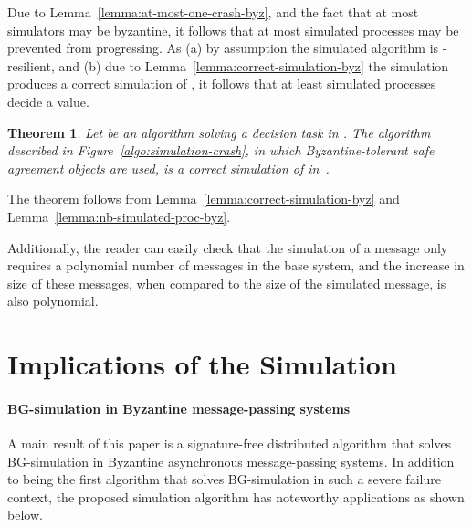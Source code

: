 \documentclass[11pt,letterpaper]{article}
\newtheorem{theorem}{Theorem}
\newlength {\afterproof}
\newcommand{\toto}{xxx}
\newenvironment{proofT}{\noindent{\bf Proof }}
{\hspace*{\fill}\par\vspace{\afterproof}}
\newenvironment{proofL}{\noindent{\bf Proof }}
{\hspace*{\fill}\par\vspace{\afterproof}}
\begin{document}
\begin{proofL}
Due to Lemma~\ref{lemma:at-most-one-crash-byz}, and the fact that at
most  simulators may be byzantine, it follows that at most 
simulated processes may be prevented from progressing. As (a) by
assumption the simulated algorithm  is -resilient, and (b) due
to Lemma~\ref{lemma:correct-simulation-byz} the simulation produces a
correct simulation of , it follows that at least 
simulated processes decide a value.
\renewcommand{\toto}{lemma:nb-simulated-proc-byz}
\end{proofL}



\begin{theorem}
\label{theorem:main-simulation-byz}
Let  be an algorithm solving a decision task in .
The algorithm described in Figure~\ref{algo:simulation-crash},
in which Byzantine-tolerant safe agreement objects are used, is a
correct simulation of  in~.
\end{theorem}

\begin{proofT}
The theorem follows from Lemma~\ref{lemma:correct-simulation-byz} and
Lemma~\ref{lemma:nb-simulated-proc-byz}.
\renewcommand{\toto}{theorem:main-simulation-byz}
\end{proofT}

Additionally, the reader can easily check that the simulation of a message only requires 
a polynomial number of messages in the base system, and the increase in size of these messages,
when compared to the size of the simulated message, is
also polynomial.

\section{Implications of the Simulation} \label{sec:conclusion}
\paragraph{BG-simulation in Byzantine message-passing systems} 
A main result of this  paper is a signature-free
distributed algorithm that solves  
BG-simulation in Byzantine asynchronous message-passing systems.
In addition to being the first  algorithm  that solves
BG-simulation in such a severe failure context, the proposed simulation
algorithm has noteworthy applications as shown below. 
\end{document}
